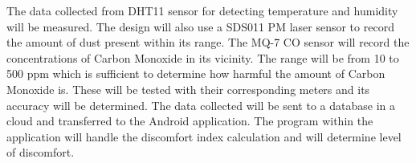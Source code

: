 The data collected from DHT11 sensor for detecting temperature and humidity will be measured. The design will also use a SDS011 PM laser sensor to record the amount of dust present within its range. The MQ-7 CO sensor will record the concentrations of Carbon Monoxide in its vicinity. The range will be from 10 to 500 ppm which is sufficient to determine how harmful the amount of Carbon Monoxide is. These will be tested with their corresponding meters and its accuracy will be determined. The data collected will be sent to a database in a cloud and transferred to the Android application. The program within the application will handle the discomfort index calculation and will determine level of discomfort.


